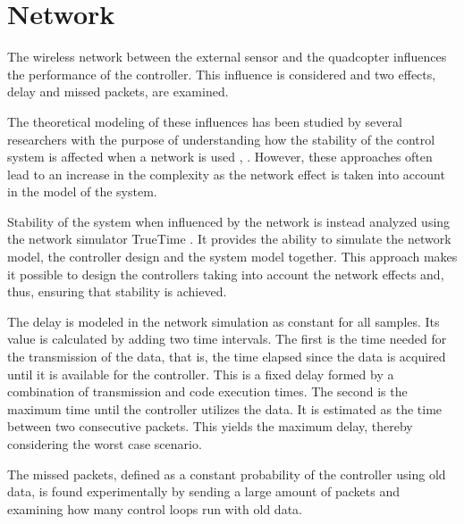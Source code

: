 \section{Network}\label{sec:network}
The wireless network between the external sensor and the quadcopter influences the performance of the controller. This influence is considered and two effects, delay and missed packets, are examined.


The theoretical modeling of these influences has been studied by several researchers with the purpose of understanding how the stability of the control system is affected when a network is used \cite{ling}, \cite{nirupam}. However, these approaches often lead to an increase in the complexity as the network effect is taken into account in the model of the system.

Stability of the system when influenced by the network is instead analyzed using the network simulator TrueTime \cite{TrueTimeNew}. It provides the ability to simulate the network model, the controller design and the system model together. This approach makes it possible to design the controllers taking into account the network effects and, thus, ensuring that stability is achieved.

The delay is modeled in the network simulation as constant for all samples. Its value is calculated by adding two time intervals. The first is the time needed for the transmission of the data, that is, the time elapsed since the data is acquired until it is available for the controller. This is a fixed delay formed by a combination of transmission and code execution times. The second is the maximum time until the controller utilizes the data. It is estimated as the time between two consecutive packets. This yields the maximum delay, thereby considering the worst case scenario.

The missed packets, defined as a constant probability of the controller using old data, is found experimentally by sending a large amount of packets and examining how many control loops run with old data. 
